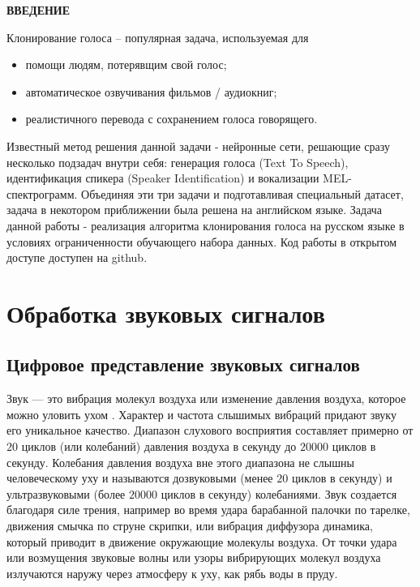 \documentclass[oneside,final,14pt]{extreport}
\begin{document}
\tableofcontents
\newpage
\begin{center}
\bfseries ВВЕДЕНИЕ
\end{center}
Клонирование голоса – популярная задача, используемая для

\begin{itemize}
    \item помощи людям, потерявщим свой голос;
    \item автоматическое озвучивания фильмов / аудиокниг;
    \item реалистичного перевода с сохранением голоса говорящего.
\end{itemize}

Известный метод решения данной задачи - нейронные сети, решающие сразу несколько подзадач внутри себя: генерация голоса (Text To Speech), идентификация спикера (Speaker Identification) и вокализации MEL-спектрограмм. Объединяя эти три задачи и подготавливая специальный датасет, задача в некотором приближении была решена на английском языке\cite{bib:voice_cloning}. Задача данной работы -  реализация алгоритма клонирования голоса на русском языке в условиях ограниченности обучающего набора данных. Код работы в открытом доступе доступен на github\cite{bib:Danya_voice_cloning}.

\chapter{Обработка звуковых сигналов}
\section{Цифровое представление звуковых сигналов} 
\label{chap:digital_repr}
Звук — это вибрация молекул воздуха или изменение давления воздуха, которое можно уловить ухом \cite{bib:web_audio}. Характер и частота слышимых вибраций придают звуку его уникальное качество. Диапазон слухового восприятия составляет примерно от $20$ циклов (или колебаний) давления воздуха в секунду до $20 000$ циклов в секунду. Колебания давления воздуха вне этого диапазона не слышны человеческому уху и называются дозвуковыми (менее $20$ циклов в секунду) и ультразвуковыми (более $20000$ циклов в секунду) колебаниями. Звук создается благодаря силе трения, например во время удара барабанной палочки по тарелке, движения смычка по струне скрипки, или вибрация диффузора динамика, который приводит в движение окружающие молекулы воздуха. От точки удара или возмущения звуковые волны или узоры вибрирующих молекул воздуха излучаются наружу через атмосферу к уху, как рябь воды в пруду.
\end{document}
